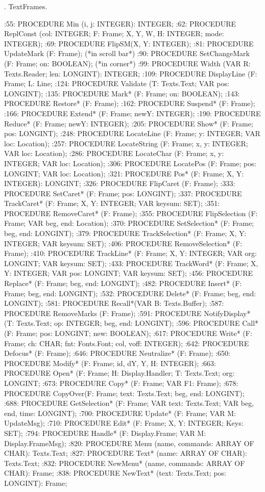 . TextFrames.

:55:  PROCEDURE Min (i, j: INTEGER): INTEGER;
:62:  PROCEDURE ReplConst (col: INTEGER; F: Frame; X, Y, W, H: INTEGER; mode: INTEGER);
:69:  PROCEDURE FlipSM(X, Y: INTEGER);
:81:  PROCEDURE UpdateMark (F: Frame);  (*in scroll bar*)
:90:  PROCEDURE SetChangeMark (F: Frame; on: BOOLEAN);  (*in corner*)
:99:  PROCEDURE Width (VAR R: Texts.Reader; len: LONGINT): INTEGER;
:109:  PROCEDURE DisplayLine (F: Frame; L: Line;
:124:  PROCEDURE Validate (T: Texts.Text; VAR pos: LONGINT);
:135:  PROCEDURE Mark* (F: Frame; on: BOOLEAN);
:143:  PROCEDURE Restore* (F: Frame);
:162:  PROCEDURE Suspend* (F: Frame);
:166:  PROCEDURE Extend* (F: Frame; newY: INTEGER);
:190:  PROCEDURE Reduce* (F: Frame; newY: INTEGER);
:205:  PROCEDURE Show* (F: Frame; pos: LONGINT);
:248:  PROCEDURE LocateLine (F: Frame; y: INTEGER; VAR loc: Location);
:257:  PROCEDURE LocateString (F: Frame; x, y: INTEGER; VAR loc: Location);
:286:  PROCEDURE LocateChar (F: Frame; x, y: INTEGER; VAR loc: Location);
:306:  PROCEDURE LocatePos (F: Frame; pos: LONGINT; VAR loc: Location);
:321:  PROCEDURE Pos* (F: Frame; X, Y: INTEGER): LONGINT;
:326:  PROCEDURE FlipCaret (F: Frame);
:333:  PROCEDURE SetCaret* (F: Frame; pos: LONGINT);
:337:  PROCEDURE TrackCaret* (F: Frame; X, Y: INTEGER; VAR keysum: SET);
:351:  PROCEDURE RemoveCaret* (F: Frame);
:355:  PROCEDURE FlipSelection (F: Frame; VAR beg, end: Location);
:370:  PROCEDURE SetSelection* (F: Frame; beg, end: LONGINT);
:379:  PROCEDURE TrackSelection* (F: Frame; X, Y: INTEGER; VAR keysum: SET);
:406:  PROCEDURE RemoveSelection* (F: Frame);
:410:  PROCEDURE TrackLine* (F: Frame; X, Y: INTEGER; VAR org: LONGINT; VAR keysum: SET);
:433:  PROCEDURE TrackWord* (F: Frame; X, Y: INTEGER; VAR pos: LONGINT; VAR keysum: SET);
:456:  PROCEDURE Replace* (F: Frame; beg, end: LONGINT);
:482:  PROCEDURE Insert* (F: Frame; beg, end: LONGINT);
:532:  PROCEDURE Delete* (F: Frame; beg, end: LONGINT);
:581:  PROCEDURE Recall*(VAR B: Texts.Buffer);
:587:  PROCEDURE RemoveMarks (F: Frame);
:591:  PROCEDURE NotifyDisplay* (T: Texts.Text; op: INTEGER; beg, end: LONGINT);
:596:  PROCEDURE Call* (F: Frame; pos: LONGINT; new: BOOLEAN);
:617:  PROCEDURE Write* (F: Frame; ch: CHAR; fnt: Fonts.Font; col, voff: INTEGER);
:642:  PROCEDURE Defocus* (F: Frame);
:646:  PROCEDURE Neutralize* (F: Frame);
:650:  PROCEDURE Modify* (F: Frame; id, dY, Y, H: INTEGER);
:663:  PROCEDURE Open* (F: Frame; H: Display.Handler; T: Texts.Text; org: LONGINT;
:673:  PROCEDURE Copy* (F: Frame; VAR F1: Frame);
:678:  PROCEDURE CopyOver(F: Frame; text: Texts.Text; beg, end: LONGINT);
:688:  PROCEDURE GetSelection* (F: Frame; VAR text: Texts.Text; VAR beg, end, time: LONGINT);
:700:  PROCEDURE Update* (F: Frame; VAR M: UpdateMsg);
:710:  PROCEDURE Edit* (F: Frame; X, Y: INTEGER; Keys: SET);
:794:  PROCEDURE Handle* (F: Display.Frame; VAR M: Display.FrameMsg);
:820:  PROCEDURE Menu (name, commands: ARRAY OF CHAR): Texts.Text;
:827:  PROCEDURE Text* (name: ARRAY OF CHAR): Texts.Text;
:832:  PROCEDURE NewMenu* (name, commands: ARRAY OF CHAR): Frame;
:838:  PROCEDURE NewText* (text: Texts.Text; pos: LONGINT): Frame;

